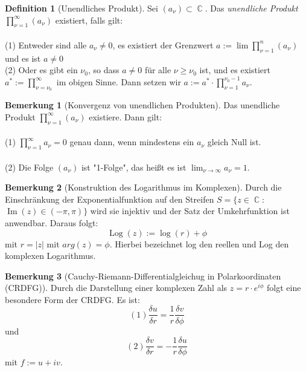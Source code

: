 \documentclass[10pt,a4paper]{article}
\theoremstyle{plain}
\theoremstyle{definition}
\newtheorem{defn}{Definition}[section]
\newtheorem*{note}{Bemerkung}
\theoremstyle{remark}
\DeclareMathOperator{\C}{\mathbb{C}}
\DeclareMathOperator{\im}{Im}
\DeclareMathOperator{\Log}{Log}
\begin{document}
\begin{defn}[Unendliches Produkt]
Sei $(a_{\nu})\subset \C$. Das \textit{unendliche Produkt} $\prod_{\nu = 1 }^{\infty}(a_{\nu})$ existiert, falls gilt:
\\
\\
(1) Entweder sind alle $a_{\nu}\neq 0$, es existiert der Grenzwert $ a := \lim \prod_{\nu = 1}^{n} (a_{\nu})$ und es ist $a \neq 0$
\\
(2) Oder es gibt ein $\nu_{0}$, so dass $a \neq 0$ für alle $\nu \geq \nu_{0}$ ist, und es existiert $a^{*} := \prod_{\nu = \nu_{0}}^{\infty}$ im obigen Sinne. Dann setzen wir $a := a^{*} 
\cdot \prod_{\nu = 1}^{\nu_{0} - 1}a_{\nu}$.

\end{defn}

\begin{note}[Konvergenz von unendlichen Produkten]

Das unendliche Produkt $\prod_{\nu = 1 }^{\infty}(a_{\nu})$ existiere. Dann gilt:
\\
\\
(1) $\prod_{\nu = 1}^{\infty}a_{\nu} = 0$ genau dann, wenn mindestens ein $a_{\nu}$ gleich Null ist.
\\
\\
(2) Die Folge $(a_{\nu})$ ist "1-Folge", das heißt es ist $\lim_{\nu \rightarrow\infty}a_{\nu} = 1$.

\end{note}

\begin{note}[Konstruktion des Logarithmus im Komplexen]

Durch die \\Einschränkung der Exponentialfunktion auf den Streifen $S = \{ z \in \C : $\\$\im(z) \in (-\pi, \pi)\}$ wird sie injektiv und der Satz der Umkehrfunktion ist anwendbar. Daraus folgt:$$\Log(z) := \log(r) + \phi$$ mit $r=|z|$ mit $arg(z)= \phi$. Hierbei bezeichnet log den reellen und Log den komplexen Logarithmus.

\end{note}

\begin{note}[Cauchy-Riemann-Differentialgleichug in Polarkoordinaten (CRDFG)]

Durch die Darstellung einer komplexen Zahl als $z = r\cdot e^{i\phi}$ folgt eine besondere Form der CRDFG. Es ist: $$(1) \frac{\delta u}{\delta r} = \frac{1}{r} \frac{\delta v}{\delta \phi}$$ und $$(2)\frac{\delta v}{\delta r} = -\frac{1}{r} \frac{\delta u}{\delta \phi}$$ mit $f := u + iv$.

\end{note}
\end{document}
